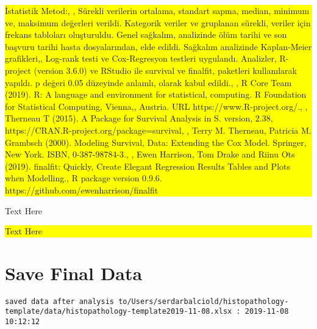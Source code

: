 \documentclass[]{article}
\begin{document}
\colorbox{yellow}{
\parbox{\dimexpr\linewidth-2\fboxsep}{

İstatistik Metod:, , Sürekli verilerin ortalama, standart sapma, median, minimum ve, maksimum değerleri verildi. Kategorik veriler ve gruplanan sürekli, veriler için frekans tabloları oluşturuldu. Genel sağkalım, analizinde ölüm tarihi ve son başvuru tarihi hasta dosyalarından, elde edildi.  Sağkalım analizinde Kaplan-Meier grafikleri,, Log-rank testi ve Cox-Regresyon testleri uygulandı. Analizler, R-project (version 3.6.0) ve RStudio ile survival ve finalfit, paketleri kullanılarak yapıldı. p değeri 0.05 düzeyinde anlamlı, olarak kabul edildi., , R Core Team (2019). R: A language and environment for statistical, computing. R Foundation for Statistical Computing, Vienna,, Austria. URL https://www.R-project.org/., , Therneau T (2015). A Package for Survival Analysis in S. version, 2.38, https://CRAN.R-project.org/package=survival, , Terry M. Therneau, Patricia M. Grambsch (2000). Modeling Survival, Data: Extending the Cox Model. Springer, New York. ISBN, 0-387-98784-3., , Ewen Harrison, Tom Drake and Riinu Ots (2019). finalfit: Quickly, Create Elegant Regression Results Tables and Plots when Modelling., R package version 0.9.6. https://github.com/ewenharrison/finalfit

}
}

\pagebreak

Text Here

\noindent

\colorbox{yellow}{
\parbox{\dimexpr\linewidth-2\fboxsep}{

Text Here

}
}

\pagebreak

\pagecolor{yellow}\afterpage{\nopagecolor}

\pagebreak

\pagebreak

\pagebreak

\hypertarget{save-final-data}{%
\section{Save Final Data}\label{save-final-data}}

\begin{verbatim}
saved data after analysis to/Users/serdarbalciold/histopathology-template/data/histopathology-template2019-11-08.xlsx : 2019-11-08 10:12:12
\end{verbatim}

\pagebreak
\end{document}
